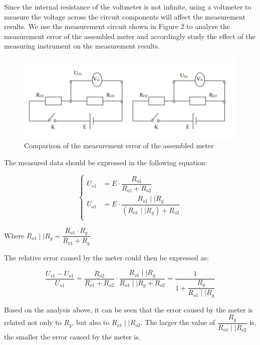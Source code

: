 \documentclass[a4paper]{article}
\begin{document}
\begin{multicols*}{2}
    Since the internal resistance of the voltmeter is not infinite, using a voltmeter to measure the voltage across the circuit components will affect the measurement results. We use the measurement circuit shown in Figure 2 to analyze the measurement error of the assembled meter and accordingly study the effect of the measuring instrument on the measurement results.


    \begin{figure}[H]
        \centering
        \includegraphics[width=0.8\linewidth]{./img/Fig.2.png}
        \caption{Comparison of the measurement error of the assembled meter}
        \label{fig:figure2}
    \end{figure}

    The measured data should be expressed in the following equation:

    \begin{equation}
        \left\{
        \begin{aligned}
            U_{s1} & = E \cdot \dfrac {R_{o1}} {R_{o1} + R_{o2}}                             \\
            U_{o1} & = E \cdot \dfrac {R_{o1} \mid\mid R_g} {(R_{o1} \mid\mid R_g) + R_{o2}} \\
        \end{aligned}
        \right.
    \end{equation}

    Where $R_{o1} \mid\mid R_g = \dfrac{R_{o1} \cdot R_g}{R_{o1} + R_g}$.

    The relative error caused by the meter could then be expressed as:

    $$
        \dfrac{U_{s1} - U_{o1}}{U_{s1}} = \dfrac{R_{o2}}{R_{o1} + R_{o2}} \cdot \dfrac{R_{o1} \mid\mid R_g}{R_{o1} \mid\mid R_g + R_{o2}} = \dfrac{1} {1 + \dfrac{R_{g}}{R_{o1} \mid\mid R_g}}
    $$

    Based on the analysis above, it can be seen that the error caused by the meter is related not only to $R_g$, but also to $R_{o1} \mid\mid R_{o2}$. The larger the value of $\dfrac{R_g}{R_{o1} \mid\mid R_{o2}}$ is, the smaller the error caused by the meter is.



\end{multicols*}
\end{document}
